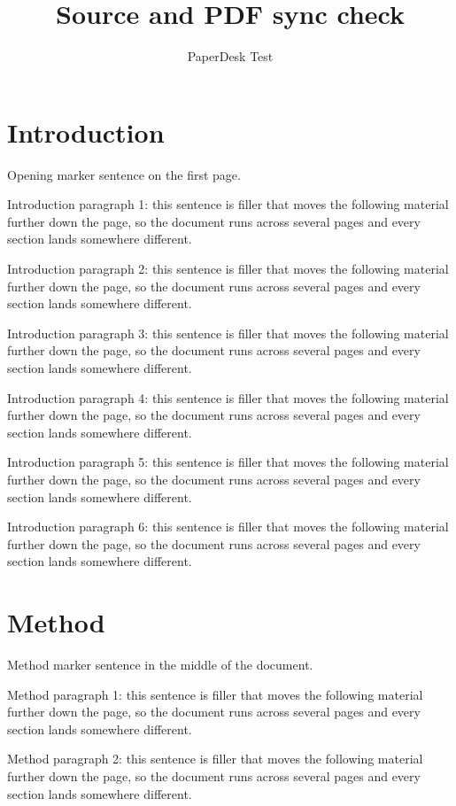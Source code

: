 \documentclass[11pt]{article}
\title{Source and PDF sync check}
\author{PaperDesk Test}
\begin{document}
\maketitle

\section{Introduction}
Opening marker sentence on the first page.

Introduction paragraph 1: this sentence is filler that moves the following material further down the page, so the document runs across several pages and every section lands somewhere different.

Introduction paragraph 2: this sentence is filler that moves the following material further down the page, so the document runs across several pages and every section lands somewhere different.

Introduction paragraph 3: this sentence is filler that moves the following material further down the page, so the document runs across several pages and every section lands somewhere different.

Introduction paragraph 4: this sentence is filler that moves the following material further down the page, so the document runs across several pages and every section lands somewhere different.

Introduction paragraph 5: this sentence is filler that moves the following material further down the page, so the document runs across several pages and every section lands somewhere different.

Introduction paragraph 6: this sentence is filler that moves the following material further down the page, so the document runs across several pages and every section lands somewhere different.

\section{Method}
Method marker sentence in the middle of the document.

Method paragraph 1: this sentence is filler that moves the following material further down the page, so the document runs across several pages and every section lands somewhere different.

Method paragraph 2: this sentence is filler that moves the following material further down the page, so the document runs across several pages and every section lands somewhere different.
\end{document}
